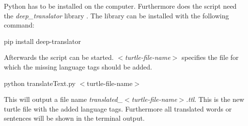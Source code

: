 Python has to be installed on the computer.
Furthermore does the script need the \textit{deep\_translator} library \cite{deep_translator}. 
The library can be installed with the following command:

\begin{center}
    pip install deep-translator
\end{center}

Afterwards the script can be started. 
\textit{$<$turtle-file-name$>$} specifies the file for which the missing language tags should be added.

\begin{center}
    python translateText.py $<$turtle-file-name$>$
\end{center}

This will output a file name \textit{translated\_$<$turtle-file-name$>$.ttl}.
This is the new turtle file with the added language tags.
Furthermore all translated words or sentences will be shown in the terminal output.
